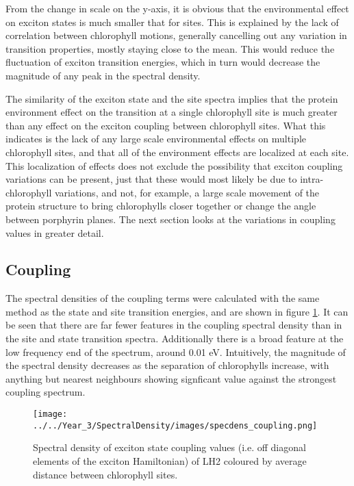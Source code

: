 From the change in scale on the y-axis, it is obvious that the environmental effect
on exciton states is much smaller that for sites. This is explained by the lack
of correlation between chlorophyll motions, generally cancelling out any variation
in \Qy transition properties, mostly staying close to the mean. This would reduce
the fluctuation of exciton transition energies, which in turn would decrease the
magnitude of any peak in the spectral density.

The similarity of the exciton state and the site spectra implies that the protein
environment effect on the transition at a single chlorophyll site is much greater 
than any effect on the exciton coupling between chlorophyll sites. What this indicates
is the lack of any large scale environmental effects on multiple chlorophyll sites,
and that all of the environment effects are localized at each site. This localization
of effects does not exclude the possibility that exciton coupling variations can 
be present, just that these would most likely be due to intra-chlorophyll variations, 
and not, for example, a large scale movement of the protein structure to bring chlorophylls
closer together or change the angle between porphyrin planes. The next section looks 
at the variations in coupling values in greater detail.

\afterpartskip
\subsection{Coupling}
\label{subcsec:coupling}

The spectral densities of the coupling terms were calculated with the same method
as the state and site transition energies, and are shown in figure \ref{fig:specdens_coupling}.
It can be seen that there are far fewer features in the coupling spectral density
than in the site and state transition spectra. Additionally there is a broad feature
at the low frequency end of the spectrum, around 0.01 eV. Intuitively, the magnitude
of the spectral density decreases as the separation of chlorophylls increase, with
anything but nearest neighbours showing signficant value against the strongest coupling 
spectrum.

\begin{figure}
    \centering
    \texttt{[image: ../../Year\_3/SpectralDensity/images/specdens\_coupling.png]}
    \caption{Spectral density of exciton state coupling values (i.e. off diagonal
    elements of the exciton Hamiltonian) of LH2 coloured by average distance between 
    chlorophyll sites.}
    \label{fig:specdens_coupling}
\end{figure}



